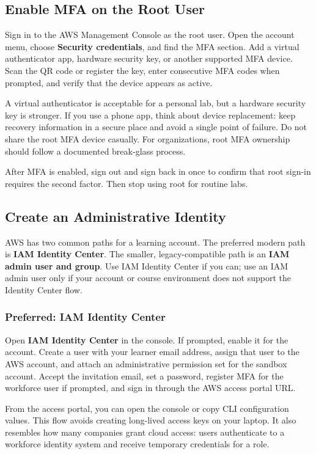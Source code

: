 \subsection{Enable MFA on the Root User}
Sign in to the AWS Management Console as the root user. Open the account menu, choose \textbf{Security credentials}, and find the MFA section. Add a virtual authenticator app, hardware security key, or another supported MFA device. Scan the QR code or register the key, enter consecutive MFA codes when prompted, and verify that the device appears as active.

A virtual authenticator is acceptable for a personal lab, but a hardware security key is stronger. If you use a phone app, think about device replacement: keep recovery information in a secure place and avoid a single point of failure. Do not share the root MFA device casually. For organizations, root MFA ownership should follow a documented break-glass process.

\begin{notebox}
After MFA is enabled, sign out and sign back in once to confirm that root sign-in requires the second factor. Then stop using root for routine labs.
\end{notebox}

\subsection{Create an Administrative Identity}
AWS has two common paths for a learning account. The preferred modern path is \textbf{IAM Identity Center}. The smaller, legacy-compatible path is an \textbf{IAM admin user and group}. Use IAM Identity Center if you can; use an IAM admin user only if your account or course environment does not support the Identity Center flow.

\subsubsection{Preferred: IAM Identity Center}
Open \textbf{IAM Identity Center} in the console. If prompted, enable it for the account. Create a user with your learner email address, assign that user to the AWS account, and attach an administrative permission set for the sandbox account. Accept the invitation email, set a password, register MFA for the workforce user if prompted, and sign in through the AWS access portal URL.

From the access portal, you can open the console or copy CLI configuration values. This flow avoids creating long-lived access keys on your laptop. It also resembles how many companies grant cloud access: users authenticate to a workforce identity system and receive temporary credentials for a role.


